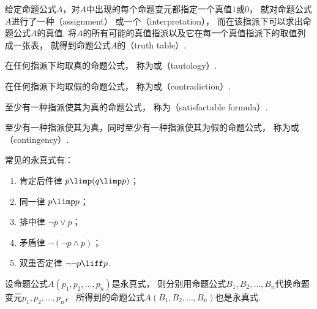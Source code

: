 给定命题公式\(A\)，对\(A\)中出现的每个命题变元都指定一个真值\(1\)或\(0\)，
就对命题公式\(A\)进行了一种（assignment）
或一个（interpretation），
而在该指派下可以求出命题公式\(A\)的真值.
将\(A\)的所有可能的真值指派以及它在每一个真值指派下的取值列成一张表，
就得到命题公式\(A\)的（truth table）.

在任何指派下均取真的命题公式，
称为或（tautology）.

在任何指派下均取假的命题公式，
称为或（contradiction）.

至少有一种指派使其为真的命题公式，
称为（satisfactable formula）.

至少有一种指派使其为真，同时至少有一种指派使其为假的命题公式，
称为或（contingency）.

常见的永真式有：
\begin{enumerate}
	\item 肯定后件律 \(p \limp (q \limp p)\)；
	\item 同一律 \(p \limp p\)；
	\item 排中律 \(\neg p \lor p\)；
	\item 矛盾律 \(\neg(\neg p \land p)\)；
	\item 双重否定律 \(\neg\neg p \liff p\).
\end{enumerate}

\begin{theorem}[永真式代入定理]
设命题公式\(A(p_1,p_2,\dotsc,p_n)\)是永真式，
则分别用命题公式\(B_1,B_2,\dotsc,B_n\)代换命题变元\(p_1,p_2,\dotsc,p_n\)，
所得到的命题公式\(A(B_1,B_2,\dotsc,B_n)\)也是永真式.
\end{theorem}


